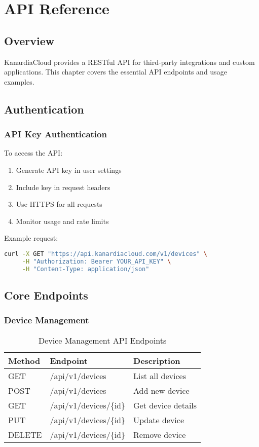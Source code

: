\chapter{API Reference}

\section{Overview}

KanardiaCloud provides a RESTful API for third-party integrations and custom applications. This chapter covers the essential API endpoints and usage examples.

\section{Authentication}

\subsection{API Key Authentication}

To access the API:

\begin{enumerate}
    \item Generate API key in user settings
    \item Include key in request headers
    \item Use HTTPS for all requests
    \item Monitor usage and rate limits
\end{enumerate}

Example request:
\begin{lstlisting}[language=bash]
curl -X GET "https://api.kanardiacloud.com/v1/devices" \
     -H "Authorization: Bearer YOUR_API_KEY" \
     -H "Content-Type: application/json"
\end{lstlisting}

\section{Core Endpoints}

\subsection{Device Management}

\begin{table}[H]
\centering
\begin{tabular}{@{}llp{6cm}@{}}
\toprule
\textbf{Method} & \textbf{Endpoint} & \textbf{Description} \\
\midrule
GET & /api/v1/devices & List all devices \\
POST & /api/v1/devices & Add new device \\
GET & /api/v1/devices/\{id\} & Get device details \\
PUT & /api/v1/devices/\{id\} & Update device \\
DELETE & /api/v1/devices/\{id\} & Remove device \\
\bottomrule
\end{tabular}
\caption{Device Management API Endpoints}
\label{tab:device_api}
\end{table}

